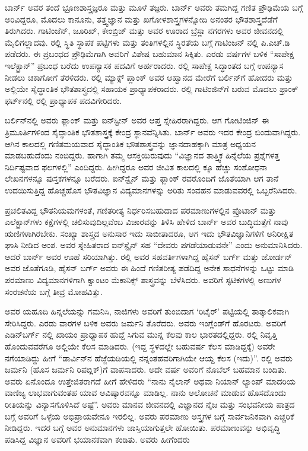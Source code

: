 ಬಾರ್ನ್ ಅವರ ತಂದೆ ಭ್ರೂಣಶಾಸ್ತ್ರಜ್ಞರೂ ಮತ್ತು ಮೂಳೆ ತಜ್ಞರು. ಬಾರ್ನ್ ಅವರು ತಮಗಿದ್ದ ಗಣಿತ ಪ್ರೌಢಿಮೆಯ ಬಗ್ಗೆ ಅರಿವಿದ್ದರೂ, ಮೊದಲು ಕಾನೂನು, ತತ್ತ್ವಜ್ಞಾನ ಮತ್ತು ಖಗೋಳಶಾಸ್ತ್ರಗಳನ್ನೋದಿ ಅನಂತರ ಭೌತಶಾಸ್ತ್ರದೆಡೆಗೆ ತಿರುಗಿದರು. ಗಾಟಿಂಜೆನ್, ಜೂರಿಖ್, ಕೇಂಬ್ರಿಜ್ ಮತ್ತು ಅವರ ಊರಾದ ಬ್ರೆಸ್ಲಾ ನಗರಗಳು ಅವರ ಜೀವನದಲ್ಲಿ ಮೈಲಿಗಲ್ಲಾದವು. ರಲ್ಲಿ ಸ್ಥಿತಿ ಸ್ಥಾಪಕ ಪಟ್ಟಿಗಳು ಮತ್ತು ತಂತಿಗಳಲ್ಲಿನ ಸ್ಥಿರತೆಯ ಬಗ್ಗೆ ಗಾಟಿಂಜನ್ ನಲ್ಲಿ ಪಿ.ಎಚ್.ಡಿ ಪಡೆದರು. ಈ ಪ್ರಬಂಧದ ಪ್ರೌಢಿಮೆಗಾಗಿ ಅವರಿಗೆ ವಿಶೇಷ ಬಹುಮಾನ ಸಿಕ್ಕಿತು. ಎರಡು ವರ್ಷಗಳ ಬಳಿಕ “ಸಾಪೇಕ್ಷ ಇಲೆಕ್ಟ್ರಾನ್” ಪ್ರಬಂಧ ಬರೆದು ಉಪನ್ಯಾಸಕ ಪದವಿಗೆ ಅರ್ಹರಾದರು. ರಲ್ಲಿ ಸಾಪೇಕ್ಷ ಸಿದ್ಧಾಂತದ ಬಗ್ಗೆ ಉಪನ್ಯಾಸ ನೀಡಲು ಚಿಕಾಗೋಗೆ ತೆರಳಿದರು. ರಲ್ಲಿ ಮ್ಯಾಕ್ಸ್ ಪ್ಲಾಂಕ್ ಅವರ ಆಹ್ವಾನದ ಮೇರೆಗೆ ಬರ್ಲಿನ್‍ಗೆ ಹೋದರು ಮತ್ತು ಅಲ್ಲಿಯೇ ಸೈದ್ಧಾಂತಿಕ ಭೌತಶಾಸ್ತ್ರದಲ್ಲಿ ಸಹಾಯಕ ಪ್ರಾಧ್ಯಾಪಕರಾದರು. ರಲ್ಲಿ ಗಾಟಿಂಜಿನ್‍ಗೆ ಬರುವ ಮೊದಲು ಫ್ರಾಂಕ್ ಫರ್ಟ್‌ನಲ್ಲಿ ರಲ್ಲಿ ಪ್ರಾಧ್ಯಾಪಕ ಪದವಿಗೇರಿದರು.

ಬರ್ಲಿನ್‍ನಲ್ಲಿ ಅವರು ಫ್ಲಾಂಕ್ ಮತ್ತು ಐನ್‍ಸ್ಟೀನ್ ಅವರ ಆಪ್ತ ಸ್ನೇಹಿರರಾಗಿದ್ದರು. ಆಗ ಗೋಟಿಂಜಿನ್ ಈ ತ್ರಿಮೂರ್ತಿಗಳಿಂದ ಸೈದ್ಧಾಂತಿಕ ಭೌತಶಾಸ್ತ್ರಕ್ಕೆ ಕೇಂದ್ರ ಸ್ಥಾನವೆನ್ನಿಸಿತು. ಬಾರ್ನ್ ಅವರು ಇದರ ಕೇಂದ್ರ ಬಿಂದುವಾಗಿದ್ದರು. ಆಗಿನ ಕಾಲದಲ್ಲಿ ಗಣಿತಮಯವಾದ ಸೈದ್ಧಾಂತಿಕ ಭೌತಶಾಸ್ತ್ರವನ್ನು ಜ್ಞಾನದಾಹಕ್ಕಾಗಿ ಮಾತ್ರ ಅಧ್ಯಯನ ಮಾಡಬಹುದೆಂದು ನಂಬಿದ್ದರು. ಹಾಗಾಗಿ ತಮ್ಮ ಆಸಕ್ತಿಯಿರುವುದು “ವಿಜ್ಞಾನದ ತಾತ್ತ್ವಿಕ ಹಿನ್ನೆಲೆಯ ಪ್ರಶ್ನೆಗಳತ್ತ ನಿರ್ದಿಷ್ಟವಾದ ಫಲಗಳಲ್ಲಿ” ಎಂದಿದ್ದರು. ಹೀಗಿದ್ದರೂ ಅವರ ಜೀವಿತ ಕಾಲದಲ್ಲಿ  ಕ್ಕೂ ಹೆಚ್ಚು ಸಂಶೋಧನಾ ಲೇಖನಗಳನ್ನೂ  ಪುಸ್ತಕಗಳನ್ನೂ ಬರೆದರು. ಐನ್‍ಸ್ಟೈನ್ ಮತ್ತು ಫ್ಲಾಂಕ್ ರವರೊಂದಿಗೆ ಜೊತೆಯಾಗಿ ಆಗ ತಾನೆ ಉದಯಿಸುತ್ತಿದ್ದ ಹೊಚ್ಚಹೊಸ ಭೌತವಿಜ್ಞಾನ ವಿದ್ಯಮಾನಗಳನ್ನು ಅರಿತು ಸಂವಹನ ಮಾಡುವವರಲ್ಲಿ ಒಬ್ಬರೆನಿಸಿದರು.

ಪ್ರಚಲಿತವಿದ್ದ ಭೌತನಿಯಮಗಳಂತೆ, ಗಣಿತರೀತ್ಯ ನಿರ್ಧರಿಸಬಹುದಾದ ಪರಮಾಣುಗಳಲ್ಲಿನ ಪ್ರೊಟಾನ್ ಮತ್ತು ಎಲೆಕ್ಟ್ರಾನ್‍ಗಳು ಕಕ್ಷೆಗಳಲ್ಲಿ ಚಲಿಸುವುದಿಲ್ಲವೆಂಬ ವಿಚಾರವನ್ನು ತಿಳಿಸಿ ಹೇಳಿದ ಬಾರ್ನ್ ಅವರ ಬುದ್ಧಿಮತ್ತೆಗೆ ನಾವು ಋಣಿಗಳಾಗಿರಬೇಕು. ಸಂಖ್ಯಾ ಶಾಸ್ತ್ರದ ಅನುಸಾರ ಇದು ಸಾಬೀತಾದರೂ, ಆಗ ಇದು ಭೌತವಿಜ್ಞಾನಿಗಳಿಗೆ ಅನಿರೀಕ್ಷಿತ ಘಾಸಿ ನೀಡಿದ ಅಂಶ. ಅವರ ಸ್ನೇಹಿತರಾದ ಐನ್‍ಸ್ಟೈನ್ ಸಹ “ದೇವರು ಪಗಡೆಯಾಡುವನೇ” ಎಂದು ಅನುಮಾನಿಸಿದರು. ಆದರೆ ಬಾರ್ನ್ ಅವರ ಊಹೆ ಸರಿಯಾಗಿತ್ತು. ರಲ್ಲಿ ಅವರ ಸಹವರ್ತಿಗಳಾಗಿದ್ದ ಹೈಸನ್ ಬರ್ಗ್ ಮತ್ತು ಜೋರ್ಡನ್ ಅವರ ಜೊತೆಗೂಡಿ, ಹೈಸನ್ ಬರ್ಗ್ ಅವರು ಈ ಹಿಂದೆ ಗಣಿತರೀತ್ಯ ಪಡೆದಿದ್ದ ಅನೇಕ ಸಾಧನೆಗಳನ್ನು ಒಟ್ಟು ಮಾಡಿ ಪರಮಾಣು ವಿದ್ಯಮಾನಗಳಿಗಾಗಿ ಕ್ವಾಂಟಂ ಮೆಕಾನಿಕ್ಸ್ ಶಾಸ್ತ್ರವನ್ನು ಬೆಳೆಸಿದರು. ಅವರಿಗೆ ಸ್ಫಟಿಕಗಳಲ್ಲಿ ಅಣುಗಳ ಸಂರಚನೆಯ ಬಗ್ಗೆ ತೀವ್ರ ಮೋಹವಿತ್ತು.

ಅವರ ಯಹೂದಿ ಹಿನ್ನಲೆಯನ್ನು ಗಮನಿಸಿ, ನಾಜಿಗಳು ಅವರಿಗೆ  ತುಂಬಿದಾಗ ‘ರಿಟೈರ್’ ಪಟ್ಟಿಯಲ್ಲಿ ತಾತ್ಕಾಲಿಕವಾಗಿ ಸೇರಿಸಿದ್ದರು. ಎರಡು ವಾರಗಳ ಬಳಿಕ ಅವರು ಜರ್ಮನಿ ತೊರೆದರು. ಅವರು ಇಂಗ್ಲೆಂಡ್‍ಗೆ ಹೊರಟರು. ಅವರಿಗೆ ಎಡಿನ್‍ಬರ್ಗ್ ನಲ್ಲಿ ಖಾಯಂ ಪ್ರಾಧ್ಯಾಪಕ ಹುದ್ದೆ ಸಿಗುವ ಮುನ್ನ ಕೆಲವು ಕಾಲ ಭಾರತದಲ್ಲಿದ್ದರು. ರಲ್ಲಿ ನಿವೃತ್ತಿ ಹೊಂದುವವರೆಗೂ ಅಲ್ಲಿಯೇ ಕೆಲಸ ಮಾಡಿದರು. (ಇದ್ದ ಸ್ಥಳದಲ್ಲೇ ಬಹುವರ್ಷ ಕೆಲಸ ಮಾಡಿದ್ದಕ್ಕೆ) ಅವರೇ ನಗೆಯಾಡಿದ್ದು ಹೀಗೆ\enginline{-} “ಡಾರ್ವಿನ್‍ನ ಹೆಜ್ಜೆಯಡಿಯಲ್ಲಿ ನನ್ನಂತಹವರಿಗಾಗಿಯೇ ಆಯ್ದ ಕೆಲಸ (ಇದು)”. ರಲ್ಲಿ ಅವರು ಜರ್ಮನಿ (ಹೊಸ ಜರ್ಮನಿ ರಿಪಬ್ಲಿಕ್)ಗೆ ವಾಪಸಾದರು. ಅದೇ ವರ್ಷ ಅವರಿಗೆ ನೊಬೆಲ್ ಬಹಮಾನ ಬಂದಿತು. ಅವರು ಏನೊಂದೂ ಉತ್ತೇಜಿತರಾಗದೆ ಹೀಗೆ ಹೇಳಿದರು\enginline{-} “ನಾನು ನೈಲಾನ್ ಅಥವಾ ನಿಯಾನ್ ಲ್ಯಾಂಪ್ ಮಾದರಿಯ ವಾಣಿಜ್ಯ ಲಾಭವಾಗುವಂತಹ ಯಾವ ಆವಿಷ್ಕಾರವನ್ನೂ ಮಾಡಿಲ್ಲ. ನಾನು ಆಲೋಚನೆ ಮಾಡುವ ಹೊಸದೊಂದು ರೀತಿಯನ್ನು ವಿನ್ಯಾಸಗೊಳಿಸಿದೆ ಅಷ್ಟೆ”. ಅವರು ಮಾನವ ಜೀವನದಲ್ಲಿ ವಿಜ್ಞಾನದ ನೈಜ ಮತ್ತು ಸಂಭವನೀಯ ಪಾತ್ರದ ಬಗ್ಗೆ ಅವರಿಗೆ ಒಳ್ಳೆಯ ಅಭಿಪ್ರಾಯವೇನೂ ಇರಲಿಲ್ಲ. ಅವರು ಪರಮಾಣು ಅಸ್ತ್ರಗಳ ಬಗ್ಗೆ ಸಾರ್ವಜನಿಕವಾಗಿ ಎಚ್ಚರಿಕೆ ನೀಡಿದ್ದರು. ಇದರ ಬಗ್ಗೆ ಅವರ ಅನುಮಾನಗಳು ಜಾಸ್ತಿಯಾಗುತ್ತಲೇ ಹೋಯಿತು. ಪರಮಾಣುವನ್ನು ಅಭಿವೃದ್ಧಿ ಪಡಿಸಿದ್ದ ವಿಜ್ಞಾನ ಅವರಿಗೆ ಭಯಾನಕವಾಗಿ ಕಂಡಿತು. ಅವರು ಹೀಗೆಂದರು\enginline{-}


